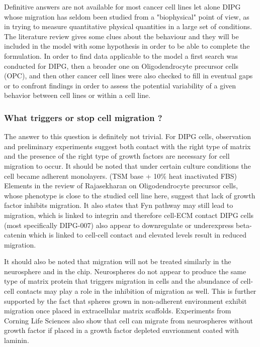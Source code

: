 \documentclass[11pt,a4paper]{article}
\begin{document}
Definitive answers are not available for most cancer cell lines let alone DIPG whose migration  has seldom been studied from a "biophysical" point of view, as in trying to measure quantitative physical quantities in a large set of conditions. The literature review gives some clues about the behaviour and they will be included in the model with some hypothesis in order to be able to complete the formulation.  In order to find data applicable to the model a first search was conducted for DIPG, then a broader one on Oligodendrocyte precursor cells (OPC), and then other cancer cell lines were also checked to fill in eventual gaps or to confront findings in order to assess the potential variability of a given behavior between cell lines or within a cell line.

\subsubsection{What triggers or stop cell migration ?}
The answer to this question is definitely not trivial. For DIPG cells, observation and preliminary experiments suggest both contact with the right type of matrix and the presence of the right type of growth factors are necessary for cell migration to occur. It should be noted  that under certain culture conditions the cell became adherent monolayers. \cite{Meel2017} (TSM base + 10\% heat inactivated FBS) Elements in the review of Rajasekharan on Oligodendrocyte precursor cells, whose phenotype is close to the studied cell line here, suggest that lack of growth factor inhibits migration. It also states that Fyn pathway may still lead to migration, which is linked to integrin and therefore cell-ECM contact \cite{Rajasekharan2009} DIPG cells (most specifically DIPG-007) also appear to downregulate or underexpress beta-catenin which is linked to cell-cell contact and elevated levels result in reduced migration.\cite{Cockle2015}

It should also be noted that migration will not be treated similarly in the neurosphere and in the chip. Neurospheres do not appear to produce the same type of matrix protein that triggers migration in cells and the abundance of cell-cell contacts may play a role in the inhibition of migration as well.\cite{Campos2004} This is further supported by the fact that spheres grown in non-adherent environment exhibit migration once placed in extracellular matrix scaffolds.\cite{Cockle2015} Experiments from Corning Life Sciences also show that cell can migrate from neurospheres without growth factor if placed in a growth factor depleted envrionment coated with laminin.\cite{Corning} 
\end{document}
